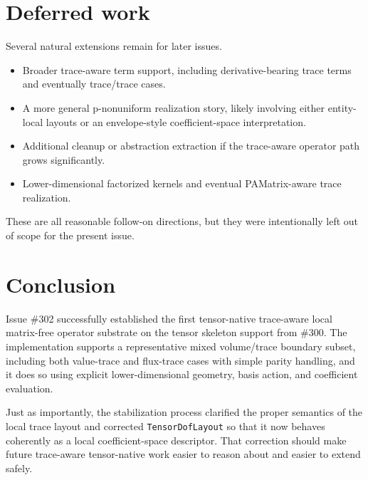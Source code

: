 \documentclass[11pt]{article}
\begin{document}
\section{Deferred work}

Several natural extensions remain for later issues.

\begin{itemize}[leftmargin=*]
  \item Broader trace-aware term support, including derivative-bearing trace terms and eventually trace/trace cases.
  \item A more general p-nonuniform realization story, likely involving either entity-local layouts or an envelope-style coefficient-space interpretation.
  \item Additional cleanup or abstraction extraction if the trace-aware operator path grows significantly.
  \item Lower-dimensional factorized kernels and eventual PAMatrix-aware trace realization.
\end{itemize}

These are all reasonable follow-on directions, but they were intentionally left out of scope for the present issue.

\section{Conclusion}

Issue \#302 successfully established the first tensor-native trace-aware local matrix-free operator substrate on the tensor skeleton support from \#300. The implementation supports a representative mixed volume/trace boundary subset, including both value-trace and flux-trace cases with simple parity handling, and it does so using explicit lower-dimensional geometry, basis action, and coefficient evaluation.

Just as importantly, the stabilization process clarified the proper semantics of the local trace layout and corrected \texttt{TensorDofLayout} so that it now behaves coherently as a local coefficient-space descriptor. That correction should make future trace-aware tensor-native work easier to reason about and easier to extend safely.
\end{document}
